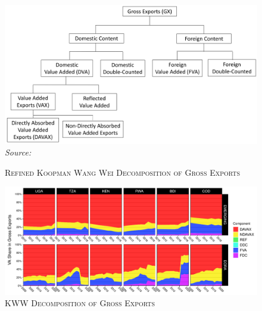 \documentclass[a4paper]{article}
\begin{document}
\begin{figure}[h!] 
\centering
\caption{\label{fig:KWW}\textsc{Refined Koopman Wang Wei Decomposition of Gross Exports}}
\includegraphics[width=1\textwidth, trim= {0 0 0 0}, clip]{"KWW_DEC_NEW.png"} \raggedleft
\scriptsize
\emph{Source:} \citet{antras2022global}
\end{figure}
\FloatBarrier

\vspace{1cm}

\begin{figure}[h!]
\centering
\caption{\label{fig:KWW_fill_ts}\textsc{KWW Decomposition of Gross Exports}}
\includegraphics[width=1\textwidth]{"KWW_DEC_NEW.pdf"} \end{figure}
\FloatBarrier


\newpage
\end{document}
